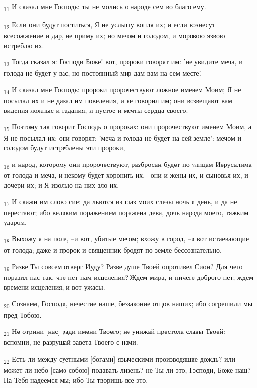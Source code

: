 \begin{tcolorbox}
\textsubscript{11} И сказал мне Господь: ты не молись о народе сем во благо ему.
\end{tcolorbox}
\begin{tcolorbox}
\textsubscript{12} Если они будут поститься, Я не услышу вопля их; и если вознесут всесожжение и дар, не приму их; но мечом и голодом, и моровою язвою истреблю их.
\end{tcolorbox}
\begin{tcolorbox}
\textsubscript{13} Тогда сказал я: Господи Боже! вот, пророки говорят им: 'не увидите меча, и голода не будет у вас, но постоянный мир дам вам на сем месте'.
\end{tcolorbox}
\begin{tcolorbox}
\textsubscript{14} И сказал мне Господь: пророки пророчествуют ложное именем Моим; Я не посылал их и не давал им повеления, и не говорил им; они возвещают вам видения ложные и гадания, и пустое и мечты сердца своего.
\end{tcolorbox}
\begin{tcolorbox}
\textsubscript{15} Поэтому так говорит Господь о пророках: они пророчествуют именем Моим, а Я не посылал их; они говорят: 'меча и голода не будет на сей земле': мечом и голодом будут истреблены эти пророки,
\end{tcolorbox}
\begin{tcolorbox}
\textsubscript{16} и народ, которому они пророчествуют, разбросан будет по улицам Иерусалима от голода и меча, и некому будет хоронить их, --они и жены их, и сыновья их, и дочери их; и Я изолью на них зло их.
\end{tcolorbox}
\begin{tcolorbox}
\textsubscript{17} И скажи им слово сие: да льются из глаз моих слезы ночь и день, и да не перестают; ибо великим поражением поражена дева, дочь народа моего, тяжким ударом.
\end{tcolorbox}
\begin{tcolorbox}
\textsubscript{18} Выхожу я на поле, --и вот, убитые мечом; вхожу в город, --и вот истаевающие от голода; даже и пророк и священник бродят по земле бессознательно.
\end{tcolorbox}
\begin{tcolorbox}
\textsubscript{19} Разве Ты совсем отверг Иуду? Разве душе Твоей опротивел Сион? Для чего поразил нас так, что нет нам исцеления? Ждем мира, и ничего доброго нет; ждем времени исцеления, и вот ужасы.
\end{tcolorbox}
\begin{tcolorbox}
\textsubscript{20} Сознаем, Господи, нечестие наше, беззаконие отцов наших; ибо согрешили мы пред Тобою.
\end{tcolorbox}
\begin{tcolorbox}
\textsubscript{21} Не отрини [нас] ради имени Твоего; не унижай престола славы Твоей: вспомни, не разрушай завета Твоего с нами.
\end{tcolorbox}
\begin{tcolorbox}
\textsubscript{22} Есть ли между суетными [богами] языческими производящие дождь? или может ли небо [само собою] подавать ливень? не Ты ли это, Господи, Боже наш? На Тебя надеемся мы; ибо Ты творишь все это.
\end{tcolorbox}
